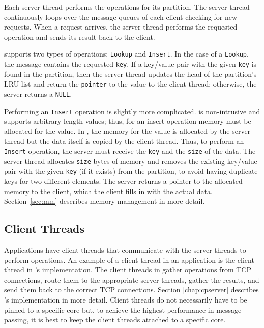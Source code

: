 Each server thread performs the operations for its partition.  The server thread
continuously loops over the message queues of each client checking for new
requests. When a request arrives, the server thread performs the requested
operation and sends its result back to the client.

\cphash{} supports two types of operations: \texttt{Lookup} and \texttt{Insert}.
In the case of a \texttt{Lookup}, the message contains the requested
\texttt{key}. If a key/value pair with the given \texttt{key} is found in the
partition, then the server thread updates the head of the partition's LRU list
and return the \texttt{pointer} to the value to the client thread; otherwise,
the server returns a \texttt{NULL}.

Performing an \texttt{Insert} operation is slightly more complicated. \cphash{}
is non-intrusive and supports arbitrary length values; thus, for an insert
operation memory must be allocated for the value. In \cphash{}, the memory for
the value is allocated by the server thread but the data itself is copied by the
client thread. Thus, to perform an \texttt{Insert} operation, the server must
receive the \texttt{key} and the \texttt{size} of the data. The server thread
allocates \texttt{size} bytes of memory and removes the existing key/value pair
with the given \texttt{key} (if it exists) from the partition, to avoid having
duplicate keys for two different elements. The server returns a pointer to the
allocated memory to the client, which the client fills in with the actual
data. Section~\ref{sec:mm} describes memory management in more detail.
  
\subsection{Client Threads}
\label{sec:clientthreads}

Applications have client threads that communicate with the server threads to
perform operations. An example of a client thread in an application is the
client thread in \cpserver{}'s implementation. The client threads in \cpserver{}
gather operations from TCP connections, route them to the appropriate server
threads, gather the results, and send them back to the correct TCP
connections. Section \ref{chap:cpserver} describes \cpserver{}'s implementation
in more detail.  Client threads do not necessarily have to be pinned to a
specific core but, to achieve the highest performance in message passing, it is
best to keep the client threads attached to a specific core.

